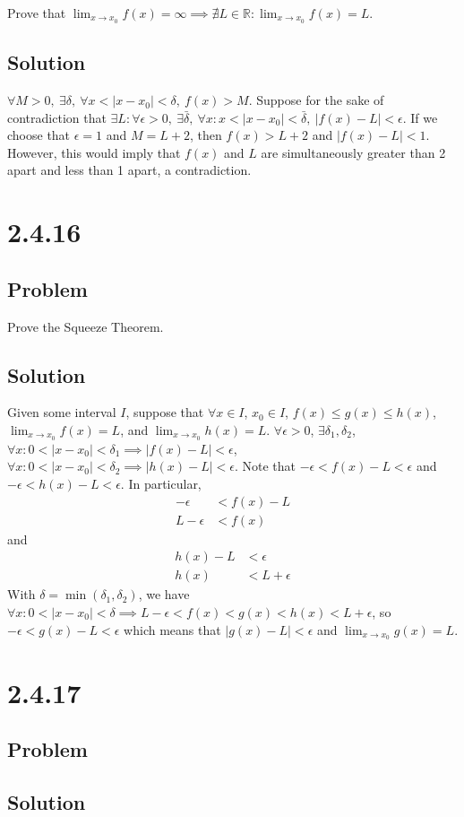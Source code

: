 \documentclass[12pt]{article}
\newcommand{\abs}  [1]{\left|       #1 \right|      }
\newcommand{\R}    [0]{\mathbb{R}                   }
\begin{document}
Prove that $\lim_{x \to x_0} f(x) = \infty \implies \nexists L \in \R : \lim_{x \to x_0} f(x) = L$.

\subsection*{Solution}

$\forall M > 0,\ \exists \delta,\ \forall x < \abs{x - x_0} < \delta,\ f(x) > M$. Suppose for the sake of contradiction that $\exists L : \forall \epsilon > 0,\ \exists \bar{\delta},\ \forall x : x < \abs{x - x_0} < \bar{\delta},\ \abs{f(x) - L} < \epsilon$. If we choose that $\epsilon = 1$ and $M = L + 2$, then $f(x) > L + 2$ and $\abs{f(x) - L} < 1$. However, this would imply that $f(x)$ and $L$ are simultaneously greater than 2 apart and less than 1 apart, a contradiction.



\section*{2.4.16}

\subsection*{Problem}

Prove the Squeeze Theorem.

\subsection*{Solution}

Given some interval $I$, suppose that $\forall x \in I$, $x_0 \in I$, $f(x) \leq g(x) \leq h(x)$, $\lim_{x \to x_0} f(x) = L$, and $\lim_{x \to x_0} h(x) = L$. $\forall \epsilon > 0$, $\exists \delta_1, \delta_2$, $\forall x : 0 < \abs{x - x_0} < \delta_1 \implies \abs{f(x) - L} < \epsilon$, $\forall x : 0 < \abs{x - x_0} < \delta_2 \implies \abs{h(x) - L} < \epsilon$. Note that $-\epsilon < f(x) - L < \epsilon$ and $-\epsilon < h(x) - L < \epsilon$. In particular,
\begin{align*}
    -\epsilon &< f(x) - L \\
    L - \epsilon &< f(x)
\end{align*}
and
\begin{align*}
    h(x) - L &< \epsilon \\
    h(x) &< L + \epsilon
\end{align*}
With $\delta = \min(\delta_1, \delta_2)$, we have $\forall x : 0 < \abs{x - x_0} < \delta \implies L - \epsilon < f(x) < g(x) < h(x) < L + \epsilon$, so $-\epsilon < g(x) - L < \epsilon$ which means that $\abs{g(x) - L} < \epsilon$ and $\lim_{x \to x_0} g(x) = L$.



\section*{2.4.17}

\subsection*{Problem}

\subsection*{Solution}
\end{document}

